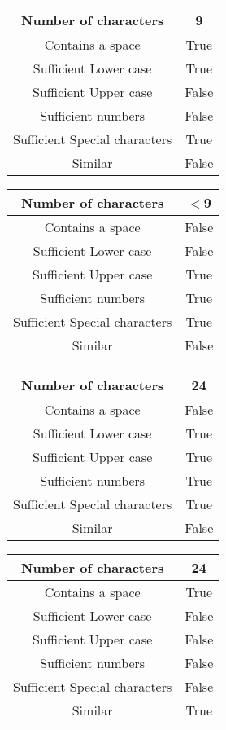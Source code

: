 \documentclass[12pt,letterpaper]{article}
\begin{document}
\begin{center}
    \begin{tabular}{||c|c||}
    \hline
	Number of characters & 9 \\
	\hline
	Contains a space & True \\
	\hline
	Sufficient Lower case & True \\
	\hline
	Sufficient Upper case& False \\
	\hline
	Sufficient numbers & False \\
	\hline
	Sufficient Special characters & True \\
	Similar & False \\
    \hline
    \end{tabular}
\end{center}
\begin{center}    
    \begin{tabular}{||c|c||}
    \hline
	Number of characters & $<$9 \\
	\hline
	Contains a space & False \\
	\hline
	Sufficient Lower case & False \\
	\hline
	Sufficient Upper case& True \\
	\hline
	Sufficient numbers & True \\
	\hline
	Sufficient Special characters & True \\
	Similar & False \\
    \hline
    \end{tabular}
\end{center}
\begin{center}    
    \begin{tabular}{||c|c||}
    \hline
	Number of characters & 24 \\
	\hline
	Contains a space & False \\
	\hline
	Sufficient Lower case & True \\
	\hline
	Sufficient Upper case& True \\
	\hline
	Sufficient numbers & True \\
	\hline
	Sufficient Special characters & True \\
	Similar & False \\
    \hline
    \end{tabular}
\end{center}
\begin{center}    
    \begin{tabular}{||c|c||}
    \hline
	Number of characters & 24 \\
	\hline
	Contains a space & True \\
	\hline
	Sufficient Lower case & False \\
	\hline
	Sufficient Upper case& False \\
	\hline
	Sufficient numbers & False \\
	\hline
	Sufficient Special characters & False \\
	Similar & True \\
    \hline
    \end{tabular}
\end{center}
\end{document}
